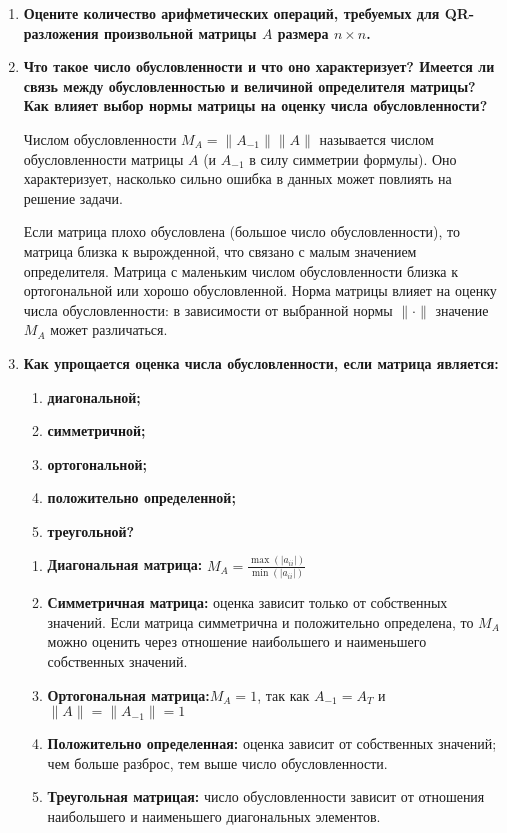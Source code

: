 \documentclass[12pt, a4paper]{article}
\begin{document}
\begin{enumerate}
	\item \textbf{Оцените количество арифметических операций, требуемых
	для QR-разложения произвольной матрицы $A$ размера $n \times n$.}
	
	



	\item \textbf{Что такое число обусловленности и что оно характеризует?
	Имеется ли связь между обусловленностью и величиной
	определителя матрицы? Как влияет выбор нормы матрицы
	на оценку числа обусловленности?}
	
		Числом обусловленности $M_{A}=\|A_{-1}\| \|A\|$ называется числом обусловленности матрицы $A$ (и $A_{-1}$ в силу симметрии формулы). Оно характеризует, насколько сильно ошибка в данных может повлиять на решение задачи.
		
		Если матрица плохо обусловлена (большое число обусловленности), то матрица близка к вырожденной, что связано с малым значением определителя.
		Матрица с маленьким числом обусловленности близка к ортогональной или хорошо обусловленной.
		Норма матрицы влияет на оценку числа обусловленности: в зависимости от выбранной нормы $\|\cdot\|$ значение $M_{A}$ может различаться.
	
	\item  \textbf{Как упрощается оценка числа обусловленности, если матрица является:}
	\begin{enumerate}
		\item \textbf{ диагональной;}
		\item \textbf{ симметричной;}
		\item \textbf{ ортогональной;}
		\item \textbf{  положительно определенной;}
		\item \textbf{ треугольной?}
	\end{enumerate}

	\begin{enumerate}
		\item \textbf{ Диагональная матрица:} $M_{A}=\frac{\max(|a_{ii}|)}{\min (|a_{ii}|)}$
		\item \textbf{ Симметричная матрица:} оценка зависит только от собственных значений. Если матрица симметрична и положительно определена, то $M_{A}$ можно оценить через отношение наибольшего и наименьшего собственных значений.
		\item \textbf{ Ортогональная матрица:}$M_{A}=1$, так как $A_{-1}=A_{T}$ и $\|A\|=\|A_{-1}\|=1$
		\item \textbf{ Положительно определенная:} оценка зависит от собственных значений; чем больше разброс, тем выше число обусловленности.
		\item \textbf{ Треугольная матрицая:} число обусловленности зависит от отношения наибольшего и наименьшего диагональных элементов.
	\end{enumerate}
	

\end{enumerate}
\end{document}
